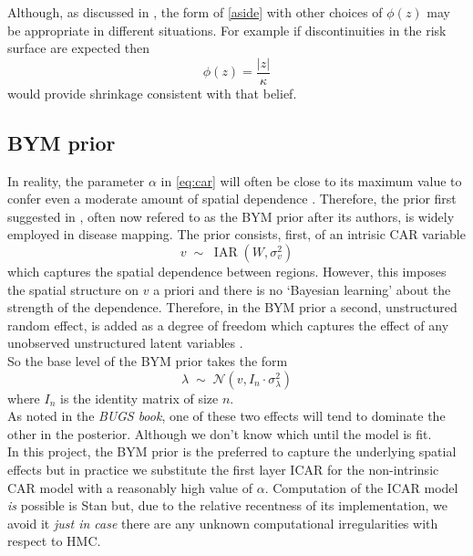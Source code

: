 \documentclass[11pt]{report}
\begin{document}
Although, as discussed in \citet{bym}, the form of \ref{aside} with other choices of $\phi(z)$ may be appropriate in different situations. For example if discontinuities in the risk surface are expected then
\begin{equation*}
\phi(z) = \frac{|z|}{\kappa}
\end{equation*}
would provide shrinkage consistent with that belief.

\subsection{BYM prior} \label{bym}

In reality, the parameter $\alpha$ in \ref{eq:car} will often be close to its maximum value to confer even a moderate amount of spatial dependence \citep{bugs}. Therefore, the prior first suggested in \citet*{bym}, often now refered to as the BYM prior after its authors, is widely employed in disease mapping. The prior consists, first, of an intrisic CAR variable
\begin{equation*}
v \; \sim \; \operatorname{IAR}(W, \sigma_v^2)
\end{equation*}
which captures the spatial dependence between regions. However, this imposes the spatial structure on $v$ a priori and there is no `Bayesian learning' about the strength of the dependence. Therefore, in the BYM prior a second, unstructured random effect, is added as a degree of freedom which captures the effect of any unobserved unstructured latent variables \citep{bugs}. \\

So the base level of the BYM prior takes the form
\begin{equation}
\lambda \; \sim \; \mathcal{N}(v, I_n \cdot \sigma_{\lambda}^2)
\end{equation}
where $I_n$ is the identity matrix of size $n$. \\

As noted in the \emph{BUGS book}, one of these two effects will tend to dominate the other in the posterior. Although we don't know which until the model is fit. \\

In this project, the BYM prior is the preferred to capture the underlying spatial effects but in practice we substitute the first layer ICAR for the non-intrinsic CAR model with a reasonably high value of $\alpha$. Computation of the ICAR model \emph{is} possible is Stan \citep{car} but, due to the relative recentness of its implementation, we avoid it \emph{just in case} there are any unknown computational irregularities with respect to HMC. \\
\end{document}
